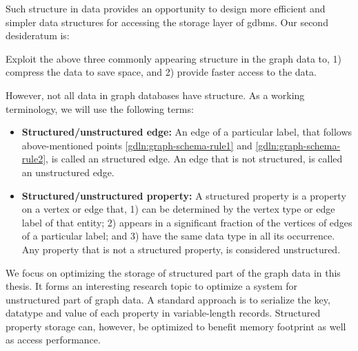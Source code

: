 \begin{guideline}
\begin{enumerate}
	\end{enumerate}
	
	Such structure in data provides an opportunity to design more efficient and simpler data structures for accessing the storage layer of \gls{gdbms}. Our second desideratum is:
	
	\begin{desideratum}
		Exploit the above three commonly appearing structure in the graph data to, 1) compress the data to save space, and 2) provide faster access to the data.
	\end{desideratum}
	
	\vspace{-10pt}
	However, not all data in graph databases have structure. As a working terminology, we will use the following terms:
	
	\begin{itemize}
		\item \textbf{Structured/unstructured edge:} An edge of a particular label, that follows above-mentioned points \ref{gdln:graph-schema-rule1} and \ref{gdln:graph-schema-rule2}, is called an structured edge. An edge that is not structured, is called an unstructured edge.
		
		\item \textbf{Structured/unstructured property:} A structured property is a property on a vertex or edge that, 1) can be determined by the vertex type or edge label of that entity; 2) appears in a significant fraction of the vertices of edges of a particular label; and 3) have the same data type in all its occurrence. Any property that is not a structured property, is considered unstructured.
		
	\end{itemize}
	
	
	We focus on optimizing the storage of structured part of the graph data in this thesis. It forms an interesting research topic to optimize a system for unstructured part of graph data. A standard approach is to serialize the key, datatype and value of each property in variable-length records. Structured property storage can, however, be optimized to benefit memory footprint as well as access performance.
	
\end{guideline}

